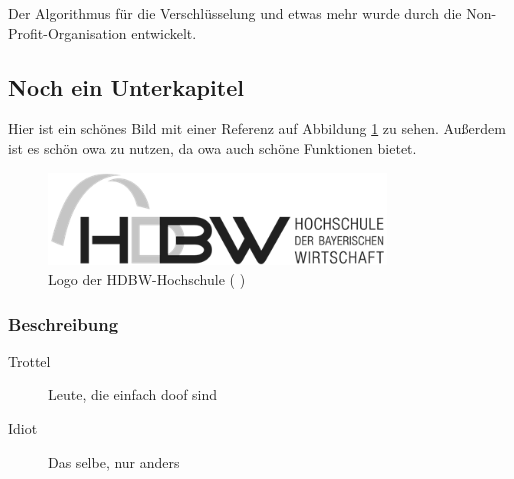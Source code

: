 \noindent Der Algorithmus für die Verschlüsselung und etwas mehr wurde durch die Non-Profit-Or\-ga\-ni\-sa\-tion entwickelt.\autocite[Vgl.][73]{HeiseHarterWettbewerb}

\subsection{Noch ein Unterkapitel}
\label{sec:Noch ein Unterkapitel}
Hier ist ein schönes Bild mit einer Referenz auf Abbildung \ref{fig:hdbw-logo} zu sehen.\autocite[Vgl.][]{HDBWLogo} Außerdem ist es schön \gls{owa} zu nutzen, da \gls{owa} auch schöne Funktionen bietet.
\begin{figure}
	\centering
	\includegraphics[width=0.8\textwidth]{"General/HDBW_Logo_large.png"}
	\caption{Logo der HDBW-Hochschule (\citeauthor{HDBWLogo} \citeyear{HDBWLogo})}
	\label{fig:hdbw-logo}
\end{figure}

\subsubsection{Beschreibung}
\label{sec:Beschreibung}
\begin{description}
	\item [Trottel] Leute, die einfach doof sind
	\item [Idiot] Das selbe, nur anders
\end{description}

